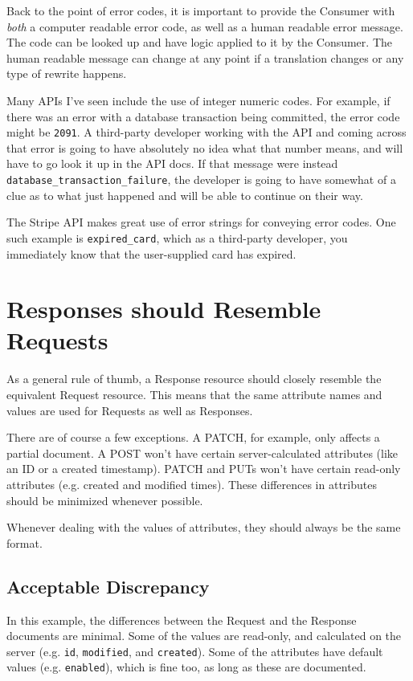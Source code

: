 \documentclass{book}
\begin{document}
Back to the point of error codes, it is important to provide the Consumer with \emph{both} a computer readable error code, as well as a human readable error message. The code can be looked up and have logic applied to it by the Consumer. The human readable message can change at any point if a translation changes or any type of rewrite happens.

Many APIs I've seen include the use of integer numeric codes. For example, if there was an error with a database transaction being committed, the error code might be \texttt{2091}. A third-party developer working with the API and coming across that error is going to have absolutely no idea what that number means, and will have to go look it up in the API docs. If that message were instead \texttt{database\_transaction\_failure}, the developer is going to have somewhat of a clue as to what just happened and will be able to continue on their way.

The Stripe API \cite[\#Errors]{STRIPEAPI} makes great use of error strings for conveying error codes. One such example is \texttt{expired\_card}, which as a third-party developer, you immediately know that the user-supplied card has expired.


\section{Responses should Resemble Requests}

As a general rule of thumb, a Response resource should closely resemble the equivalent Request resource. This means that the same attribute names and values are used for Requests as well as Responses.

There are of course a few exceptions. A PATCH, for example, only affects a partial document. A POST won't have certain server-calculated attributes (like an ID or a created timestamp). PATCH and PUTs won't have certain read-only attributes (e.g. created and modified times). These differences in attributes should be minimized whenever possible.

Whenever dealing with the values of attributes, they should always be the same format.

\subsection{Acceptable Discrepancy}

In this example, the differences between the Request and the Response documents are minimal. Some of the values are read-only, and calculated on the server (e.g. \texttt{id}, \texttt{modified}, and \texttt{created}). Some of the attributes have default values (e.g. \texttt{enabled}), which is fine too, as long as these are documented.
\end{document}
